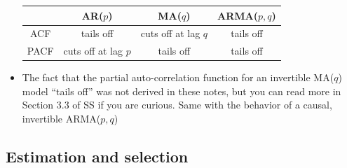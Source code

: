 \documentclass{article}
\begin{document}
\begin{itemize}
  \begin{center} \smallskip
  \begin{tabular}{|c|c|c|c|}
  \hline
  & AR($p$) & MA($q$) & ARMA($p,q$) \\
  \hline
  ACF & tails off & cuts off at lag $q$ & tails off \\
  \hline
  PACF & cuts off at lag $p$ & tails off & tails off \\
  \hline
  \end{tabular} \smallskip
  \end{center}

\item The fact that the partial auto-correlation function for an invertible
  MA($q$) model ``tails off'' was not derived in these notes, but you can read
  more in Section 3.3 of SS if you are curious. Same with the behavior of a
  causal, invertible ARMA($p,q$) 
\end{itemize}

\subsection{Estimation and selection}
\end{document}
